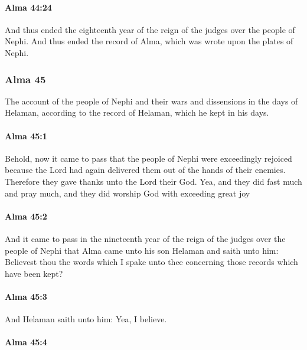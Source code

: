 		\paragraph{Alma 44:24} %
			\label{ALMA-44-24}

			And thus ended the eighteenth year
			of the reign of the judges over the people of Nephi.
			And thus ended the record of Alma,
			which was wrote upon the plates of Nephi.

	\subsubsection{Alma 45} %
		\label{ALMA-45}
		
		The account of the people of Nephi
		and their wars and dissensions in the days of Helaman,
		according to the record of Helaman, which he kept in his days.
		
		\paragraph{Alma 45:1} %
			\label{ALMA-45-1}

			Behold, now it came to pass that the people of Nephi were exceedingly rejoiced
			because the Lord had again delivered them out of the hands of their enemies.
			Therefore they gave thanks unto the Lord their God.
			Yea, and they did fast much and pray much,
			and they did worship God with exceeding great joy

		\paragraph{Alma 45:2} %
			\label{ALMA-45-2}

			And it came to pass in the nineteenth year
			of the reign of the judges over the people of Nephi
			that Alma came unto his son Helaman and saith unto him:
			Believest thou the words which I spake unto thee
			concerning those records which have been kept?

		\paragraph{Alma 45:3} %
			\label{ALMA-45-3}

			And Helaman saith unto him:
			Yea, I believe.

		\paragraph{Alma 45:4} %
			\label{ALMA-45-4}

